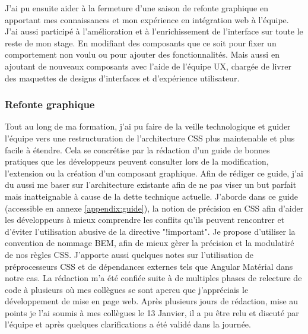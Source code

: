 \documentclass[12pt, a4paper]{report}
\newcommand\tab[1][1cm]{\hspace*{#1}}
\begin{document}
J'ai pu ensuite aider à la fermeture d'une saison de refonte graphique en apportant mes connaissances et mon expérience en intégration web à l'équipe.\newline
J'ai aussi participé à l'amélioration et à l'enrichissement de l'interface sur toute le reste de mon stage. En modifiant des composants que ce soit pour fixer un comportement non voulu ou pour ajouter des fonctionnalités. Mais aussi en ajoutant de nouveaux composants avec l'aide de l'équipe UX, chargée de livrer des maquettes de designs d'interfaces et d'expérience utilisateur.\newline

\subsubsection{Refonte graphique}
\tab{}Tout au long de ma formation, j'ai pu faire de la veille technologique et guider l'équipe vers une restructuration de l'architecture CSS plus maintenable et plus facile à étendre.\newline
Cela se concrétise par la rédaction d'un guide de bonnes pratiques que les développeurs peuvent consulter lors de la modification, l'extension ou la création d'un composant graphique.
Afin de rédiger ce guide, j'ai du aussi me baser sur l'architecture existante afin de ne pas viser un but parfait mais inatteignable à cause de la dette technique actuelle.\newline
J'aborde dans ce guide (accessible en annexe \ref{appendix:guide}), la notion de précision en CSS afin d'aider les développeurs à mieux comprendre les conflits qu'ils peuvent rencontrer et d'éviter l'utilisation abusive de la directive "!important". Je propose d'utiliser la convention de nommage BEM, afin de mieux gèrer la précision et la modulatiré de nos règles CSS. J'apporte aussi quelques notes sur l'utilisation de préprocesseurs CSS et de dépendances externes tels que Angular Matérial dans notre cas.\newline
La rédaction m'a été confiée suite à de multiples phases de relecture de code à plusieurs où mes collègues se sont apercu que j'appréciais le développement de mise en page web. Après plusieurs jours de rédaction, mise au points je l'ai soumis à mes collègues le 13 Janvier, il a pu être relu et discuté par l'équipe et après quelques clarifications a été validé dans la journée.\newline
\end{document}
